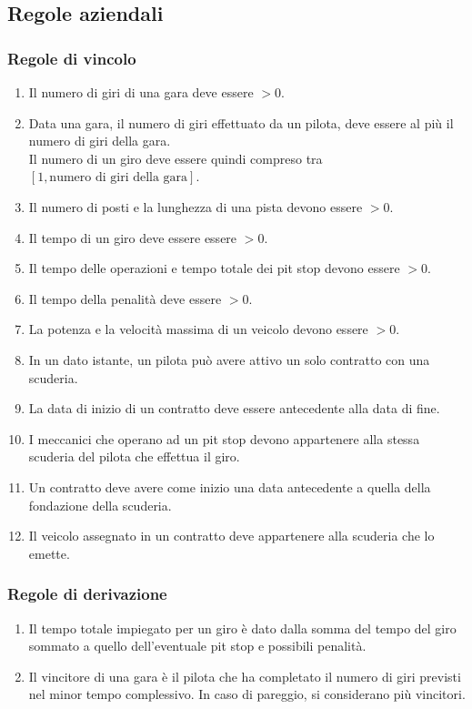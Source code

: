 \documentclass[11pt]{article}
\begin{document}
\subsection{Regole aziendali}
\subsubsection{Regole di vincolo}
\begin{enumerate}[label={RV \arabic*}, leftmargin=4em]
    \item Il numero di giri di una gara deve essere $>0$.
    \item Data una gara, il numero di giri effettuato da un pilota, deve essere al più il numero di giri della gara.\\
          Il numero di un giro deve essere quindi compreso tra $[1, \text{numero di giri della gara}]$.
    \item Il numero di posti e la lunghezza di una pista devono essere $>0$. 
    \item Il tempo di un giro deve essere essere $>0$. 
    \item Il tempo delle operazioni e tempo totale dei pit stop devono essere $>0$.
    \item Il tempo della penalità deve essere $>0$.
    \item La potenza e la velocità massima di un veicolo devono essere $>0$.
    \item In un dato istante, un pilota può avere attivo un solo contratto con una scuderia.
    \item La data di inizio di un contratto deve essere antecedente alla data di fine.
    \item I meccanici che operano ad un pit stop devono appartenere alla stessa scuderia del pilota che effettua il giro.
    \item Un contratto deve avere come inizio una data antecedente a quella della fondazione della scuderia.
    \item Il veicolo assegnato in un contratto deve appartenere alla scuderia che lo emette.
\end{enumerate}

\subsubsection{Regole di derivazione}
\begin{enumerate}[label={RD \arabic*}, leftmargin=4em]
    \item Il tempo totale impiegato per un giro è dato dalla somma del tempo del giro sommato a quello dell'eventuale pit stop e possibili penalità.
    \item Il vincitore di una gara è il pilota che ha completato il numero di giri previsti nel minor tempo complessivo. In caso di pareggio, si considerano più vincitori.
\end{enumerate}
\end{document}
